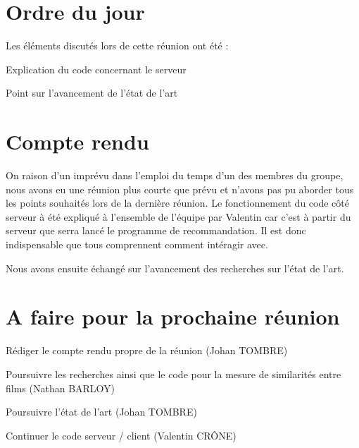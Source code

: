 \documentclass[11pt]{meetingmins}
\begin{document}
\maketitle

\section{Ordre du jour}
Les éléments discutés lors de cette réunion ont été :
\begin{hiddenitems}
	\item Explication du code concernant le serveur
	\item Point sur l'avancement de l'état de l'art
\end{hiddenitems}

\section {Compte rendu}
  On raison d'un imprévu dans l'emploi du temps d'un des membres du groupe, nous avons eu une réunion plus courte que prévu et n'avons pas pu aborder tous les points souhaités lors de la dernière réunion.
	Le fonctionnement du code côté serveur à été expliqué à l'ensemble de l'équipe par Valentin car c'est à partir du serveur que serra lancé le programme de recommandation. Il est donc indispensable que tous comprennent comment intéragir avec.\par
	Nous avons ensuite échangé sur l'avancement des recherches sur l'état de l'art.
\section{A faire pour la prochaine réunion}
\begin{items}
	\item Rédiger le compte rendu propre de la réunion (Johan TOMBRE)
	\item Poursuivre les recherches ainsi que le code pour la mesure de similarités entre films (Nathan BARLOY)
	\item Poursuivre l'état de l'art (Johan TOMBRE)
	\item Continuer le code serveur / client (Valentin CRÔNE)
\end{items}
\vspace{1cm}
\end{document}
